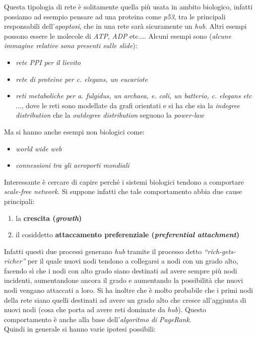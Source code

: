 \documentclass[a4paper,12pt, oneside]{book}
\begin{document}
Questa tipologia di rete è solitamente quella più usata in ambito
biologico, infatti possiamo ad esempio pensare ad una proteina come
\textit{p53}, tra le principali responsabili dell'\textit{apoptosi}, che in una
rete sarà sicuramente un \textit{hub}. Altri esempi possono essere le molecole
di \textit{ATP}, \textit{ADP} etc$\ldots$. Alcuni esempi sono (\textit{alcune
  immagine relative sono presenti sulle slide}): 
\begin{itemize}
  \item \textit{rete PPI per il lievito}
  \item \textit{rete di proteine per c. elegans, un eucariote}
  \item \textit{reti metaboliche per a. fulgidus, un archaea, e. coli, un
    batterio, c. elegans etc$\ldots$}, dove le reti sono modellate da grafi
  orientati e si ha che sia la \textit{indegree distribution} che la
  \textit{outdegree distribution} seguono la \textit{power-law}
\end{itemize}
Ma si hanno anche esempi non biologici come:
\begin{itemize}
  \item \textit{world wide web}
  \item \textit{connessioni tra gli aeroporti mondiali}
\end{itemize}
Interessante è cercare di capire perché i sistemi biologici tendono a comportare
\textit{scale-free network}. Si suppone infatti che tale comportamento abbia
due cause principali:
\begin{enumerate}
  \item la \textbf{crescita (\textit{growth})}
  \item il cosiddetto \textbf{attaccamento preferenziale (\textit{preferential
      attachment})} 
\end{enumerate}
Infatti questi due processi generano \textit{hub} tramite il processo detto
\textit{``rich-gets-richer''} per il quale nuovi nodi tendono a collegarsi a
nodi con un grado alto, facendo sì che i nodi con alto grado siano destinati ad
avere sempre più nodi incidenti, aumentandone ancora il grado e aumentando la
possibilità che nuovi nodi vengano attaccati a loro. Si ha inoltre che è molto
probabile che i primi nodi della rete siano quelli destinati ad avere un grado
alto che cresce all'aggiunta di nuovi nodi (cosa che porta ad avere reti
dominate da \textit{hub}). Questo comportamento è anche alla base
dell'\textit{algoritmo di PageRank}. \\
Quindi in generale si hanno varie ipotesi possibili:
\end{document}
